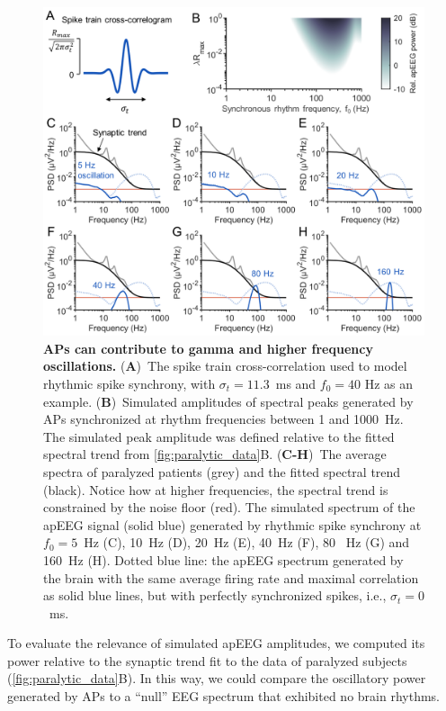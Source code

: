 \begin{figure}[t!]
    \centering
    \includegraphics[width=13.2cm]{Figures/chapter3/figure6.png}
    \caption{\textbf{APs can contribute to gamma and higher frequency oscillations.} (\textbf{A})~The spike train cross-correlation used to model rhythmic spike synchrony, with $\sigma_t=11.3$~\unit{\milli\second} and $f_0=40$ \unit{\hertz} as an example. (\textbf{B})~Simulated amplitudes of spectral peaks generated by APs synchronized at rhythm frequencies between 1 and 1000~\unit{\hertz}. The simulated peak amplitude was defined relative to the fitted spectral trend from {\autoref{fig:paralytic_data}B}. (\textbf{C-H})~The average spectra of paralyzed patients (grey) and the fitted spectral trend (black). Notice how at higher frequencies, the spectral trend is constrained by the noise floor (red). The simulated spectrum of the apEEG signal (solid blue) generated by rhythmic spike synchrony at $f_0=5$~\unit{\hertz} (C), 10~\unit{\hertz} (D), 20~\unit{\hertz} (E), 40~\unit{\hertz} (F), 80 ~\unit{\hertz} (G) and 160~\unit{\hertz} (H). Dotted blue line: the apEEG spectrum generated by the brain with the same average firing rate and maximal correlation as solid blue lines, but with perfectly synchronized spikes, i.e., $\sigma_t=0$~\unit{\milli\second}.}
    \label{fig:oscillations}
\end{figure}

To evaluate the relevance of simulated apEEG amplitudes, we computed its power relative to the synaptic trend fit to the data of paralyzed subjects ({\autoref{fig:paralytic_data}B}). In this way, we could compare the oscillatory power generated by APs to a ``null'' EEG spectrum that exhibited no brain rhythms.

